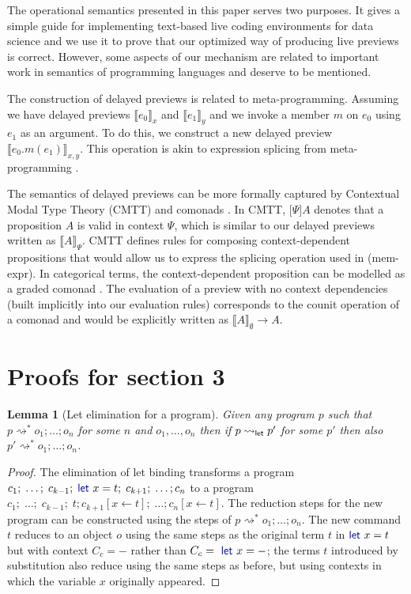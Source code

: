 \documentclass[english,submission]{programming}
\newcounter{thc}
\theoremstyle{plain}
\newtheorem{lem}[thc]{Lemma}
\theoremstyle{definition}
\newcommand{\ident}[1]{\textnormal{\textcolor{idclr}{\sffamily #1}}}
\newcommand{\kvd}[1]{\textnormal{\textcolor{kvdclr}{\sffamily #1}}}
\newcommand{\rname}[1]{{\sffamily(#1)}}
\begin{document}
The operational semantics presented in this paper serves two purposes. It gives a simple guide
for implementing text-based live coding environments for data science and we use it to prove that
our optimized way of producing live previews is correct. However, some aspects of our mechanism
are related to important work in semantics of programming languages and deserve to be mentioned.

The construction of delayed previews is related to meta-programming. Assuming
we have delayed previews $\llbracket e_0 \rrbracket_x$ and $\llbracket e_1 \rrbracket_y$ and
we invoke a member $m$ on $e_0$ using $e_1$ as an argument. To do this, we construct a new
delayed preview $\llbracket e_0.m(e_1) \rrbracket_{x, y}$. This operation is akin to expression
splicing from meta-programming \cite{metaml,quotations}.

The semantics of delayed previews can be more formally captured by Contextual Modal Type Theory
(CMTT) \cite{cmtt} and comonads \cite{cmtt-denotation}. In CMTT, $\lbrack \Psi \rbrack A$ denotes
that a proposition $A$ is valid in context $\Psi$, which is similar to our delayed previews written
as $\llbracket A \rrbracket_\Psi$. CMTT defines rules for composing context-dependent propositions
that would allow us to express the splicing operation used in \rname{mem-expr}. In categorical
terms, the context-dependent proposition can be modelled as a graded comonad \cite{effectrev,graded}.
The evaluation of a preview with no context dependencies (built implicitly into our evaluation rules)
corresponds to the counit operation of a comonad and would be explicitly written as
$\llbracket A \rrbracket_\emptyset \rightarrow A$.


\section{Proofs for section 3}
\label{sec:let-lang-elimination}

\begin{lem}[Let elimination for a program]
\label{thm:let-lang-elimination-proof}
Given any program $p$ such that $p \rightsquigarrow^{*} o_1;\ldots;o_n$ for some $n$ and $o_1, \ldots, o_n$
then if $p \rightsquigarrow_\ident{let} p'$ for some $p'$ then also $p' \rightsquigarrow^{*} o_1;\ldots;o_n$.
\end{lem}
\begin{proof}
The elimination of let binding transforms a program $c_1;\; \ldots;\; c_{k-1};\; \kvd{let}~x=t;\; c_{k+1};\; \ldots; c_n$
to a program $c_1;\; \ldots;\; c_{k-1};\; t; c_{k+1}[x\leftarrow t];\; \ldots; c_n[x\leftarrow t]$.
The reduction steps for the new program can be constructed using the steps of $p \rightsquigarrow^{*} o_1;\ldots;o_n$.
The new command $t$ reduces to an object $o$ using the same steps as the original term $t$
in $\kvd{let}~x=t$ but with context $C_c = -$ rather than $C_c = \kvd{let}~x=-$; the terms $t$
introduced by substitution also reduce using the same steps as before, but using
contexts in which the variable $x$ originally appeared.
\end{proof}
\end{document}
